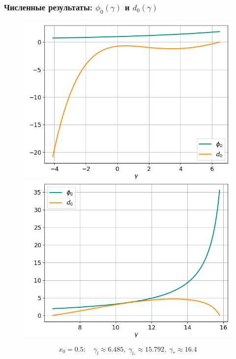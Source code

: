 \documentclass[fullscreen=true, unicode, bookmarks=false]{beamer}
\begin{document}
\begin{frame}
\frametitle{ Численные результаты: $ \phi_0(\gamma) $ и $ d_0(\gamma) $ }

\begin{figure} 
\includegraphics[scale=0.37]{divergent_phi0d0_12_1.png}  
\hfill
\includegraphics[scale=0.37]{divergent_phi0d0_12_2.png}  
\end{figure}

$$ x_0 = 0.5: \quad \gamma_l \approx 6.485, \; \gamma_{l_*} \approx 15.792, \; \gamma_* \approx 16.4 $$

\end{frame}
\end{document}
